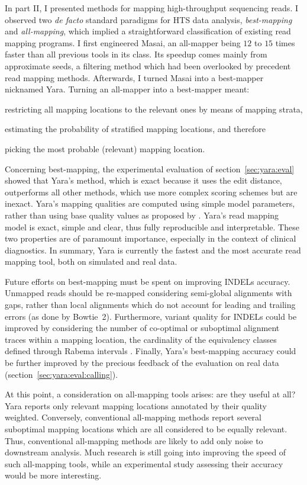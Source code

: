 In part II, I presented methods for mapping high-throughput sequencing reads.
I observed two \emph{de facto} standard paradigms for HTS data analysis, \emph{best-mapping} and \emph{all-mapping}, which implied a straightforward classification of existing read mapping programs.
I first engineered Masai, an all-mapper being $12$ to $15$ times faster than all previous tools in its class.
Its speedup comes mainly from approximate seeds, a filtering method which had been overlooked by precedent read mapping methods.
Afterwards, I turned Masai into a best-mapper nicknamed Yara.
Turning an all-mapper into a best-mapper meant:
\begin{inparaenum}[(i)]
\item restricting all mapping locations to the relevant ones by means of mapping strata,
\item estimating the probability of stratified mapping locations, and therefore 
\item picking the most probable (\ie relevant) mapping location.
\end{inparaenum}

Concerning best-mapping, the experimental evaluation of section~\ref{sec:yara:eval} showed that Yara's method, which is exact because it uses the edit distance, outperforms all other methods, which use more complex scoring schemes but are inexact.
Yara's mapping qualities are computed using simple model parameters, rather than using base quality values as proposed by \cite{Li2009}.
Yara's read mapping model is exact, simple and clear, thus fully reproducible and interpretable.
These two properties are of paramount importance, especially in the context of clinical diagnostics.
In summary, Yara is currently the fastest and the most accurate read mapping tool, both on simulated and real data.

Future efforts on best-mapping must be spent on improving INDELs accuracy.
Unmapped reads should be re-mapped considering semi-global alignments with gaps, rather than local alignments which do not account for leading and trailing errors (\eg as done by Bowtie~2).
Furthermore, variant quality for INDELs could be improved by considering the number of co-optimal or suboptimal alignment traces within a mapping location, \ie the cardinality of the equivalency classes defined through Rabema intervals \citep{Holtgrewe2011}.
Finally, Yara's best-mapping accuracy could be further improved by the precious feedback of the evaluation on real data (section~\ref{sec:yara:eval:calling}).

At this point, a consideration on all-mapping tools arises: are they useful at all?
Yara reports only relevant mapping locations annotated by their quality \ie weighted.
Conversely, conventional all-mapping methods report several suboptimal mapping locations which are all considered to be equally relevant.
Thus, conventional all-mapping methods are likely to add only noise to downstream analysis.
Much research is still going into improving the speed of such all-mapping tools, while an experimental study assessing their accuracy would be more interesting.
